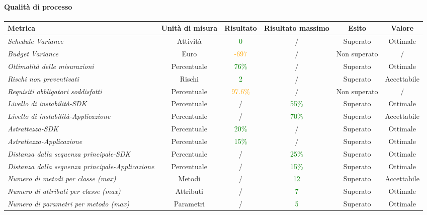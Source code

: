 \paragraph{Qualità di processo}
\begin{longtable}{|>{\centering}m{5cm}|c|c|c|c|c|}
\hline
\textbf{Metrica} & \textbf{Unità di misura} & \textbf{Risultato} & \textbf{Risultato massimo} & \textbf{Esito} & \textbf{Valore}\\
\hline
\endhead

\emph{Schedule Variance} & {Attività} & \textcolor{Green}{0} & / & Superato & Ottimale\\ \hline
\emph{Budget Variance} & {Euro} & \textcolor{Orange}{-697} & / & Non superato & /\\ \hline
\emph{Ottimalità delle misurazioni} & {Percentuale} & \textcolor{Green}{76\%} & / & Superato & Ottimale \\ \hline
\emph{Rischi non preventivati} & {Rischi} & \textcolor{Green}{2} & / & Superato & Accettabile\\ \hline
\emph{Requisiti obbligatori soddisfatti} & {Percentuale} & \textcolor{Orange}{97.6\%} & / & Non superato & /\\ \hline
\emph{Livello di instabilità-SDK} & {Percentuale} & / & \textcolor{Green}{55\%} & Superato & Ottimale\\ \hline
\emph{Livello di instabilità-Applicazione} & {Percentuale} & / & \textcolor{Green}{70\%} & Superato & Accettabile\\ \hline
\emph{Astrattezza-SDK} & {Percentuale} & \textcolor{Green}{20\%} & / & Superato & Ottimale\\ \hline
\emph{Astrattezza-Applicazione} & {Percentuale} &\textcolor{Green}{15\%} & / & Superato & Ottimale\\ \hline
\emph{Distanza dalla sequenza principale-SDK} & {Percentuale} & / & \textcolor{Green}{25\%} & Superato & Ottimale\\ \hline
\emph{Distanza dalla sequenza principale-Applicazione} & {Percentuale} & / & \textcolor{Green}{15\%} & Superato & Ottimale\\ \hline
\emph{Numero di metodi per classe (max)} & {Metodi} & / & \textcolor{Green}{12} & Superato & Accettabile\\ \hline
\emph{Numero di attributi per classe (max)} & {Attributi} & / & \textcolor{Green}{7} & Superato & Ottimale\\ \hline
\emph{Numero di parametri per metodo (max)} & {Parametri} & / & \textcolor{Green}{5} & Superato & Ottimale\\ \hline

\end{longtable}
